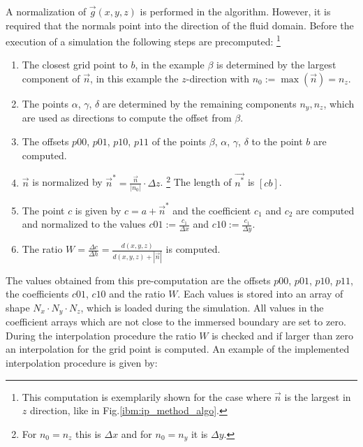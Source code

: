 A normalization of $\vec{g}(x, y, z)$ is performed in the algorithm.
However, it is required that the normals point into the direction of the fluid domain.
Before the execution of a simulation the following steps are precomputed:
\footnote{This computation is exemplarily shown for the case where $\vec{n}$ is the largest in $z$ direction, like in  Fig.\ref{ibm:ip_method_algo}.}


\begin{enumerate}
    \item The closest grid point to $b$, in the example  $\beta$ is determined by the largest component of $\vec{n}$, in this example
          the $z$-direction with $n_0 := \max(\vec{n}) = n_z$.

    \item The points $\alpha$, $\gamma$, $\delta$ are determined by the remaining components ${n_y, n_z}$, which are used as directions to
            compute the offset from $\beta$.

    \item The offsets $p00$, $p01$, $p10$, $p11$ of the points $\beta$, $\alpha$, $\gamma$, $\delta$ to the point $b$ are computed.

    \item $\vec{n}$ is normalized by $\vec{n}^* = \frac{\vec{n}}{|n_0|}\cdot \Delta z$.
            \footnote{For $n_0=n_z$ this is $\Delta x$ and for $n_0=n_y$ it is $\Delta y$.}
            The length of $\vec{n^*}$ is $[cb]$.

    \item The point $c$ is given by $c = a + \vec{n}^*$ and the coefficient $c_1$ and $c_2$ are computed and normalized to the values
           $c01 := \frac{c_1}{\Delta x}$ and $c10 := \frac{c_1}{\Delta y}$.
    \item The ratio $W=\frac{\Delta c}{\Delta h} = \frac{d(x, y, z)}{d(x, y, z) + |\vec{n}| }$ is computed.
\end{enumerate}

The values obtained from this pre-computation are the offsets  $p00$, $p01$, $p10$, $p11$, the coefficients $c01$, $c10$ and
the ratio $W$. Each values is stored into an array of shape $N_x \cdot N_y \cdot N_z$, which is loaded during the simulation.
All values in the coefficient arrays which are not close to the immersed boundary are set to zero.
During the interpolation procedure the ratio $W$ is checked and if larger than zero an interpolation for the grid point is computed.
An example of the implemented interpolation procedure is given by:

